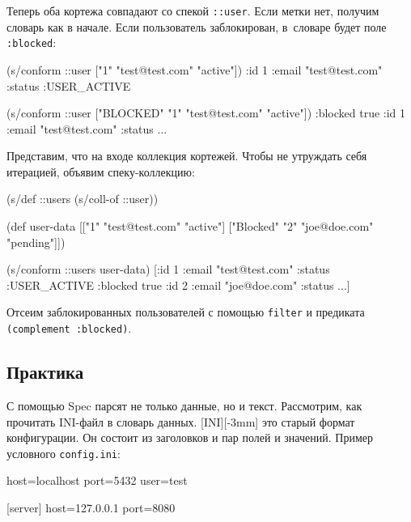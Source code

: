 Теперь оба кортежа совпадают со спекой \verb|::user|. Если метки нет, получим
словарь как в начале. Если пользователь заблокирован, в~словаре будет поле
\verb|:blocked|:

\begin{english}
  \begin{clojure}
(s/conform ::user ["1" "test@test.com" "active"])
{:id 1 :email "test@test.com" :status :USER_ACTIVE}

(s/conform ::user ["BLOCKED" "1" "test@test.com" "active"])
{:blocked true :id 1 :email "test@test.com" :status ...}
  \end{clojure}
\end{english}

Представим, что на входе коллекция кортежей. Чтобы не утруждать себя итерацией,
объявим спеку-коллекцию:

\begin{english}
  \begin{clojure}
(s/def ::users (s/coll-of ::user))

(def user-data
  [["1" "test@test.com" "active"]
   ["Blocked" "2" "joe@doe.com" "pending"]])

(s/conform ::users user-data)
[{:id 1 :email "test@test.com" :status :USER_ACTIVE}
 {:blocked true :id 2 :email "joe@doe.com" :status ...}]
  \end{clojure}
\end{english}


Отсеим заблокированных пользователей с помощью \verb|filter| и предиката
\verb|(complement :blocked)|.

\subsection{Практика}


С помощью Spec парсят не только данные, но и текст. Рассмотрим, как прочитать
INI-файл в словарь данных. [INI][-3mm]
это старый формат конфигурации. Он состоит из заголовков и пар полей и
значений. Пример условного \verb|config.ini|:

\begin{english}
  \begin{ini}
[database]
host=localhost
port=5432
user=test

[server]
host=127.0.0.1
port=8080
  \end{ini}
\end{english}

